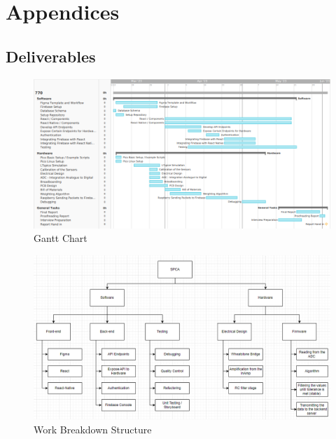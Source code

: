 
\part{Appendices}

\chapter{Deliverables}\label{appendix:deliverables}

\begin{figure}
    \centering
    \includegraphics[width=\textwidth]{images/gantt.png}
    \caption{Gantt Chart}
\end{figure}

\begin{figure}
    \centering
    \includegraphics[width=\textwidth]{images/workbreakdown.png}
    \caption{Work Breakdown Structure}
\end{figure}


